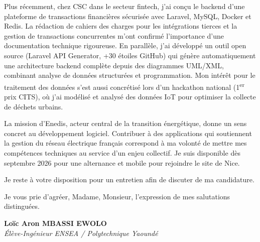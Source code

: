 \documentclass[a4paper,11pt]{article}
\begin{document}
Plus récemment, chez CSC dans le secteur fintech, j'ai conçu le backend d'une plateforme de transactions financières sécurisée avec Laravel, MySQL, Docker et Redis. La rédaction de cahiers des charges pour les intégrations tierces et la gestion de transactions concurrentes m'ont confirmé l'importance d'une documentation technique rigoureuse. En parallèle, j'ai développé un outil open source (Laravel API Generator, +30 étoiles GitHub) qui génère automatiquement une architecture backend complète depuis des diagrammes UML/XML, combinant analyse de données structurées et programmation. Mon intérêt pour le traitement des données s'est aussi concrétisé lors d'un hackathon national (1\textsuperscript{er} prix CITS), où j'ai modélisé et analysé des données IoT pour optimiser la collecte de déchets urbains.

La mission d'Enedis, acteur central de la transition énergétique, donne un sens concret au développement logiciel. Contribuer à des applications qui soutiennent la gestion du réseau électrique français correspond à ma volonté de mettre mes compétences techniques au service d'un enjeu collectif. Je suis disponible dès septembre 2026 pour une alternance et mobile pour rejoindre le site de Nice.

Je reste à votre disposition pour un entretien afin de discuter de ma candidature.

Je vous prie d'agréer, Madame, Monsieur, l'expression de mes salutations distinguées.

\vspace{0.8cm}

\textbf{Loïc Aron MBASSI EWOLO}\\
\textit{Élève-Ingénieur ENSEA / Polytechnique Yaoundé}
\end{document}
